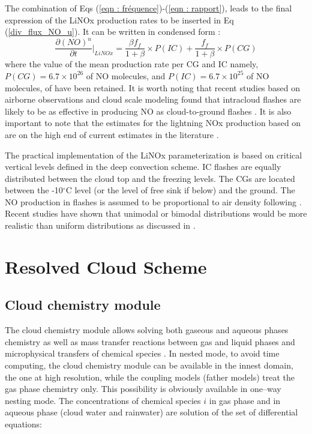 The combination of Eqs (\ref{eqn : fréquence})-(\ref{eqn : rapport}), leads to
the final expression of the LiNOx production rates to be inserted in
Eq (\ref{div_flux_NO_u}). It can be written in condensed form :
\begin{equation}\label{LiNOx_rate_ud}
{\frac {\partial (NO)^{u}}{\partial t}} \bigg\vert_{LiNOx} = \frac{\beta f_f}{1+\beta}\times P(IC) + \frac{f_f}{1+\beta}\times P(CG)
\end{equation}
where the value of the mean production rate per CG and IC namely, 
$P(CG) = 6.7\times 10^{26}$ of NO molecules, and 
$P(IC) = 6.7\times 10^{25}$ of NO molecules, of
\citet{Price1997} have been retained. 
It is worth noting that recent studies based on airborne observations and 
cloud scale modeling found that intracloud flashes are likely to be as 
effective 
in producing NO as cloud-to-ground flashes 
\citep{DeCaria2000,Fehr2004,Ridley2005}. 
It is also important to note that the estimates for the lightning 
NOx production based on \citet{Price1992,Price1994,Price1997}
are on the high end of current estimates in the  literature
\citep{Labrador2005}. 

The practical implementation of the LiNOx parameterization is based on critical 
vertical levels defined in the deep convection scheme. IC flashes are equally 
distributed between the cloud top and the freezing levels. The CGs are located 
between the -10$^{\circ}$C level (or the level of free sink if below) and the 
ground. The NO production in flashes 
is assumed to be proportional to air density following 
\citet{Goldenbaum1993}. 
Recent studies have shown that unimodal or bimodal distributions would be more 
realistic than uniform distributions as discussed in 
\citet{MacGorman1998,DeCaria2000,DeCaria2005}. 

\section{Resolved Cloud Scheme}
 \subsection{Cloud chemistry module}
The cloud chemistry module allows solving both gaseous and aqueous phases chemistry 
as well as mass transfer reactions between gas and liquid phases and microphysical 
transfers of chemical species \citep{Leriche2013}. In nested mode, to avoid time computing, 
the cloud chemistry module can be available in the innest domain, the one at high resolution, 
while the coupling models (father models) treat the gas phase chemistry only. This possibility 
is obviously available in one--way nesting mode. The concentrations of chemical species $i$ 
in gas phase and in aqueous phase (cloud water and rainwater) are solution of 
the set of differential equations:

